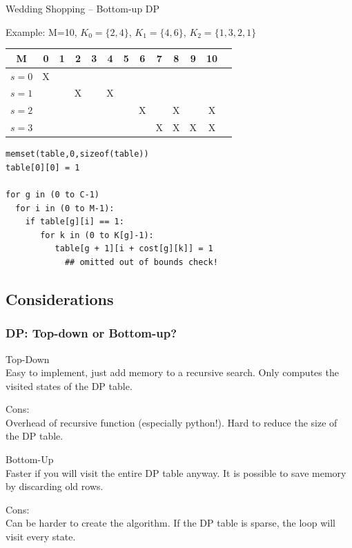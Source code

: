 \begin{frame}[fragile]{Wedding Shopping -- Bottom-up DP}

  Example: M=10, \alert<2>{$K_0=\{2,4\}$}, \alert<3>{$K_1=\{4,6\}$}, \alert<4>{$K_2=\{1,3,2,1\}$}
  \bigskip

  \begin{tabular}{|c||c|c|c|c|c|c|c|c|c|c|c|c|}
    \hline
    M & 0 & 1 & 2 & 3 & 4 & 5 & 6 & 7 & 8 & 9 & 10\\
    \hline
    $s=0$ & X & & & & & & & & & & \\
    $s=1$ & & & X & & X & & & & & & \\
    $s=2$ & & & & & & & X & & X & & X\\
    $s=3$ & & & & & & & & X & X & X & X\\
    \hline
  \end{tabular}
  {\smaller
  \begin{block}{}
\begin{verbatim}
memset(table,0,sizeof(table))
table[0][0] = 1

for g in (0 to C-1)
  for i in (0 to M-1):
    if table[g][i] == 1:
       for k in (0 to K[g]-1):
          table[g + 1][i + cost[g][k]] = 1
            ## omitted out of bounds check!
\end{verbatim}
  \end{block}}
\end{frame}

\subsection{Considerations}

\begin{frame}
  \frametitle{DP: Top-down or Bottom-up?}

  \begin{block}{Top-Down}
    \\
    Easy to implement, just add memory to a recursive search. Only computes the visited states of the DP table.

    \alert{Cons:}\\
    Overhead of recursive function (especially python!). Hard to reduce the size of the DP table.
  \end{block}

  \begin{block}{Bottom-Up}
    \\
    Faster if you will visit the entire DP table anyway. It is possible to save memory by discarding old rows.

    \alert{Cons:}\\
    Can be harder to create the algorithm. If the DP table is sparse, the loop will visit every state.
  \end{block}
\end{frame}

